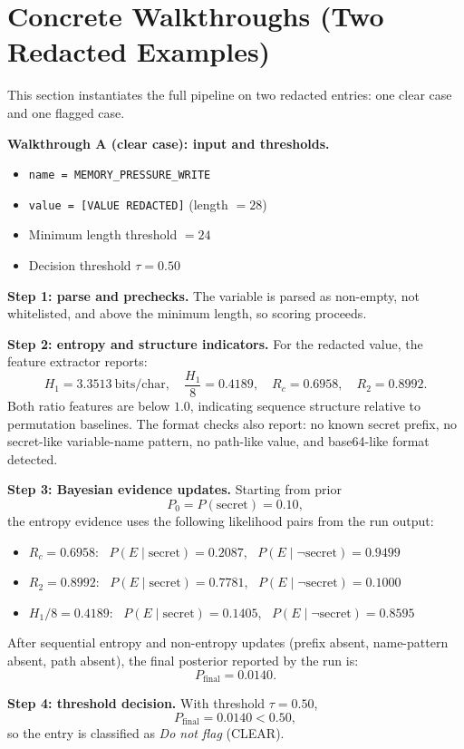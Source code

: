 \documentclass[10pt]{article}
\begin{document}
\section*{Concrete Walkthroughs (Two Redacted Examples)}

This section instantiates the full pipeline on two redacted entries: one clear case and one flagged case.

\textbf{Walkthrough A (clear case): input and thresholds.}
\begin{itemize}
  \item \texttt{name = MEMORY\_PRESSURE\_WRITE}
  \item \texttt{value = [VALUE REDACTED]} (length $=28$)
  \item Minimum length threshold $=24$
  \item Decision threshold $\tau=0.50$
\end{itemize}

\textbf{Step 1: parse and prechecks.}
The variable is parsed as non-empty, not whitelisted, and above the minimum length, so scoring proceeds.

\textbf{Step 2: entropy and structure indicators.}
For the redacted value, the feature extractor reports:
\[
H_1=3.3513\ \text{bits/char},\quad \frac{H_1}{8}=0.4189,\quad R_c=0.6958,\quad R_2=0.8992.
\]
Both ratio features are below $1.0$, indicating sequence structure relative to permutation baselines. The format checks also report: no known secret prefix, no secret-like variable-name pattern, no path-like value, and base64-like format detected.

\textbf{Step 3: Bayesian evidence updates.}
Starting from prior
\[
P_0=P(\text{secret})=0.10,
\]
the entropy evidence uses the following likelihood pairs from the run output:
\begin{itemize}
  \item $R_c=0.6958$: \ $P(E\mid\text{secret})=0.2087$, \ $P(E\mid\neg\text{secret})=0.9499$
  \item $R_2=0.8992$: \ $P(E\mid\text{secret})=0.7781$, \ $P(E\mid\neg\text{secret})=0.1000$
  \item $H_1/8=0.4189$: \ $P(E\mid\text{secret})=0.1405$, \ $P(E\mid\neg\text{secret})=0.8595$
\end{itemize}
After sequential entropy and non-entropy updates (prefix absent, name-pattern absent, path absent), the final posterior reported by the run is:
\[
P_{\mathrm{final}}=0.0140.
\]

\textbf{Step 4: threshold decision.}
With threshold $\tau=0.50$,
\[
P_{\mathrm{final}}=0.0140<0.50,
\]
so the entry is classified as \emph{Do not flag} (CLEAR).
\end{document}
